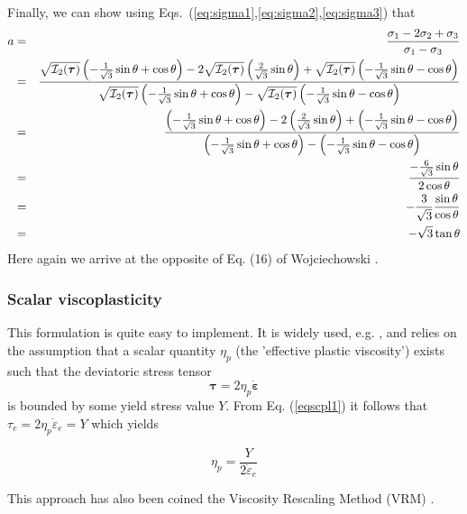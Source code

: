 Finally, we can show using Eqs.~(\ref{eq:sigma1},\ref{eq:sigma2},\ref{eq:sigma3}) that
\begin{eqnarray}
a 
&=&\frac{\sigma_1-2\sigma_2+\sigma_3}{\sigma_1-\sigma_3} \nonumber\\
&=& 
\frac{
\sqrt{{\cal I}_2({\bm \tau})} \left(-\frac{1}{\sqrt{3}}\sin \theta +\cos\theta \right) 
-2
\sqrt{{\cal I}_2({\bm \tau})} \left(\frac{2}{\sqrt{3}}\sin \theta   \right)   
+
\sqrt{{\cal I}_2({\bm \tau})} \left(-\frac{1}{\sqrt{3}}\sin \theta- \cos \theta \right)  
}{
\sqrt{{\cal I}_2({\bm \tau})} \left(-\frac{1}{\sqrt{3}}\sin \theta +\cos\theta \right)
- 
\sqrt{{\cal I}_2({\bm \tau})} \left(-\frac{1}{\sqrt{3}}\sin \theta- \cos \theta \right)  
}
\nonumber \\
&=& 
\frac{
\left(-\frac{1}{\sqrt{3}}\sin \theta +\cos\theta \right) 
-2
\left(\frac{2}{\sqrt{3}}\sin \theta   \right)   
+
\left(-\frac{1}{\sqrt{3}}\sin \theta- \cos \theta \right)  
}{
\left(-\frac{1}{\sqrt{3}}\sin \theta +\cos\theta \right)
- 
\left(-\frac{1}{\sqrt{3}}\sin \theta- \cos \theta \right)  
}
\nonumber \\
&=& 
\frac{
-\frac{6}{\sqrt{3}}\sin \theta  
}
{
2\cos\theta
}
\nonumber\\
&=& -\frac{3}{\sqrt{3}} \frac{\sin\theta}{\cos\theta} \nonumber\\
&=& -\sqrt{3} \tan\theta
\end{eqnarray}
Here again we arrive at the opposite of Eq. (16) of Wojciechowski \cite{wojc18}. 

\subsubsection{Scalar viscoplasticity}

This formulation is quite easy to implement. It is widely used, e.g. \cite{will92,thfb08,spmw16}, and relies on the assumption that 
a scalar quantity $\eta_p$ (the 'effective plastic viscosity') exists such that the deviatoric stress tensor 
\begin{equation}
{\bm \tau}=2\eta_p \dot{\bm\varepsilon} \label{eqscpl1}
\end{equation}
is bounded by some yield stress value $Y$.
From Eq. (\ref{eqscpl1}) it follows that ${\tau}_{e}= 2\eta_p \dot{\varepsilon}_{e}=Y$ which yields
\begin{mdframed}[backgroundcolor=blue!5]
\[
\eta_p = \frac{Y}{2 \dot{\varepsilon}_{e}}
\]
\end{mdframed}
This approach has also been coined the Viscosity Rescaling Method (VRM) \cite{kacha04}. 
 

